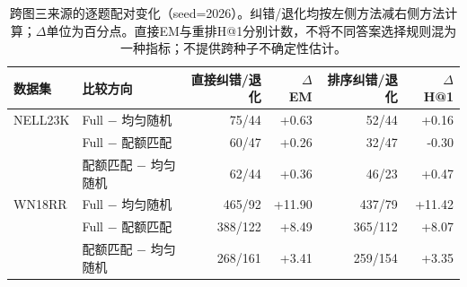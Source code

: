 \begin{table}[htbp]
\caption{跨图三来源的逐题配对变化（seed=2026）。纠错/退化均按左侧方法减右侧方法计算；$\Delta$单位为百分点。直接EM与重排H@1分别计数，不将不同答案选择规则混为一种指标；不提供跨种子不确定性估计。}
\label{tab:cross-source-pairs}
\centering\small
\begin{tabular}{llrrrr}
\toprule
数据集 & 比较方向 & 直接纠错/退化 & $\Delta$ EM & 排序纠错/退化 & $\Delta$ H@1 \\
\midrule
NELL23K & Full $-$ 均匀随机 & 75/44 & +0.63 & 52/44 & +0.16 \\
 & Full $-$ 配额匹配 & 60/47 & +0.26 & 32/47 & -0.30 \\
 & 配额匹配 $-$ 均匀随机 & 62/44 & +0.36 & 46/23 & +0.47 \\
WN18RR & Full $-$ 均匀随机 & 465/92 & +11.90 & 437/79 & +11.42 \\
 & Full $-$ 配额匹配 & 388/122 & +8.49 & 365/112 & +8.07 \\
 & 配额匹配 $-$ 均匀随机 & 268/161 & +3.41 & 259/154 & +3.35 \\
\bottomrule
\end{tabular}
\end{table}
